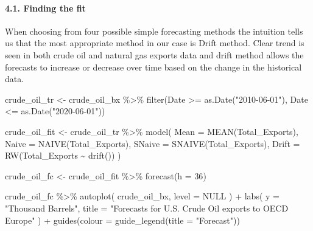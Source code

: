 \documentclass[
]{article}
\newenvironment{Shaded}{\begin{snugshade}}{\end{snugshade}}
\newcommand{\AttributeTok}[1]{\textcolor[rgb]{0.77,0.63,0.00}{#1}}
\newcommand{\ConstantTok}[1]{\textcolor[rgb]{0.00,0.00,0.00}{#1}}
\newcommand{\DecValTok}[1]{\textcolor[rgb]{0.00,0.00,0.81}{#1}}
\newcommand{\FunctionTok}[1]{\textcolor[rgb]{0.00,0.00,0.00}{#1}}
\newcommand{\NormalTok}[1]{#1}
\newcommand{\OtherTok}[1]{\textcolor[rgb]{0.56,0.35,0.01}{#1}}
\newcommand{\SpecialCharTok}[1]{\textcolor[rgb]{0.00,0.00,0.00}{#1}}
\newcommand{\StringTok}[1]{\textcolor[rgb]{0.31,0.60,0.02}{#1}}
\begin{document}
\hypertarget{finding-the-fit}{%
\paragraph{4.1. Finding the fit}\label{finding-the-fit}}

When choosing from four possible simple forecasting methods the
intuition tells us that the most appropriate method in our case is Drift
method. Clear trend is seen in both crude oil and natural gas exports
data and drift method allows the forecasts to increase or decrease over
time based on the change in the historical data.

\begin{Shaded}
\begin{Highlighting}[]
\NormalTok{crude\_oil\_tr }\OtherTok{\textless{}{-}}\NormalTok{ crude\_oil\_bx }\SpecialCharTok{\%\textgreater{}\%} 
  \FunctionTok{filter}\NormalTok{(Date }\SpecialCharTok{\textgreater{}=} \FunctionTok{as.Date}\NormalTok{(}\StringTok{"2010{-}06{-}01"}\NormalTok{), Date }\SpecialCharTok{\textless{}=} \FunctionTok{as.Date}\NormalTok{(}\StringTok{"2020{-}06{-}01"}\NormalTok{))}

\NormalTok{crude\_oil\_fit }\OtherTok{\textless{}{-}}\NormalTok{ crude\_oil\_tr }\SpecialCharTok{\%\textgreater{}\%} 
  \FunctionTok{model}\NormalTok{(}
    \AttributeTok{Mean =} \FunctionTok{MEAN}\NormalTok{(Total\_Exports),}
    \AttributeTok{Naive =} \FunctionTok{NAIVE}\NormalTok{(Total\_Exports),}
    \AttributeTok{SNaive =} \FunctionTok{SNAIVE}\NormalTok{(Total\_Exports),}
    \AttributeTok{Drift =} \FunctionTok{RW}\NormalTok{(Total\_Exports }\SpecialCharTok{\textasciitilde{}} \FunctionTok{drift}\NormalTok{())}
\NormalTok{  )}

\NormalTok{crude\_oil\_fc }\OtherTok{\textless{}{-}}\NormalTok{ crude\_oil\_fit }\SpecialCharTok{\%\textgreater{}\%} 
  \FunctionTok{forecast}\NormalTok{(}\AttributeTok{h =} \DecValTok{36}\NormalTok{)}

\NormalTok{crude\_oil\_fc }\SpecialCharTok{\%\textgreater{}\%} 
  \FunctionTok{autoplot}\NormalTok{(}
\NormalTok{    crude\_oil\_bx,}
    \AttributeTok{level =} \ConstantTok{NULL}
\NormalTok{  ) }\SpecialCharTok{+}
  \FunctionTok{labs}\NormalTok{(}
    \AttributeTok{y =} \StringTok{"Thousand Barrels"}\NormalTok{,}
    \AttributeTok{title =} \StringTok{"Forecasts for U.S. Crude Oil exports to OECD Europe"}
\NormalTok{  ) }\SpecialCharTok{+}
  \FunctionTok{guides}\NormalTok{(}\AttributeTok{colour =} \FunctionTok{guide\_legend}\NormalTok{(}\AttributeTok{title =} \StringTok{"Forecast"}\NormalTok{))}
\end{Highlighting}
\end{Shaded}
\end{document}

